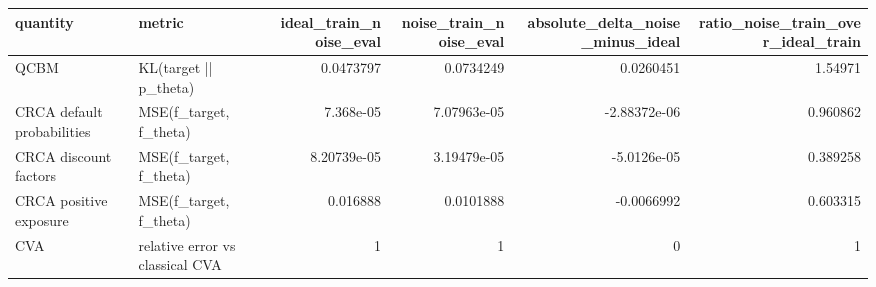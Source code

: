 \begin{tabular}{llrrrr}
\toprule
quantity & metric & ideal_train_noise_eval & noise_train_noise_eval & absolute_delta_noise_minus_ideal & ratio_noise_train_over_ideal_train \\
\midrule
QCBM & KL(target || p_theta) & 0.0473797 & 0.0734249 & 0.0260451 & 1.54971 \\
CRCA default probabilities & MSE(f_target, f_theta) & 7.368e-05 & 7.07963e-05 & -2.88372e-06 & 0.960862 \\
CRCA discount factors & MSE(f_target, f_theta) & 8.20739e-05 & 3.19479e-05 & -5.0126e-05 & 0.389258 \\
CRCA positive exposure & MSE(f_target, f_theta) & 0.016888 & 0.0101888 & -0.0066992 & 0.603315 \\
CVA & relative error vs classical CVA & 1 & 1 & 0 & 1 \\
\bottomrule
\end{tabular}
